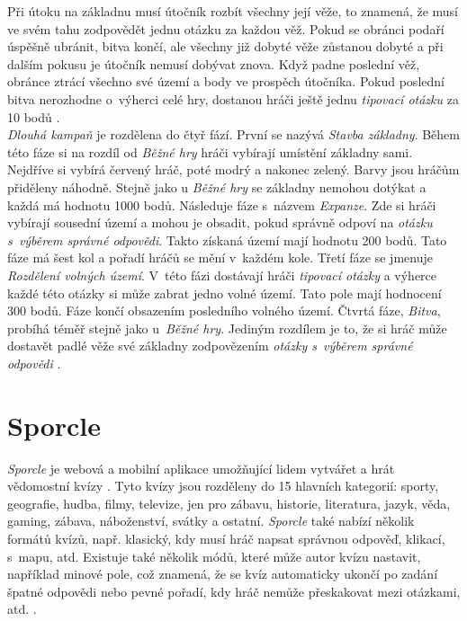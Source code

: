 \documentclass[12pt]{report}
\begin{document}
	  Při útoku na základnu musí útočník rozbít všechny její věže, to znamená, že musí ve svém tahu zodpovědět jednu otázku za každou věž. Pokud se obránci podaří úspěšně ubránit, bitva končí, ale všechny již dobyté věže zůstanou dobyté a při dalším pokusu je útočník nemusí dobývat znova. Když padne poslední věž, obránce ztrácí všechno své území a body ve prospěch útočníka. Pokud poslední bitva nerozhodne o~výherci celé hry, dostanou hráči ještě jednu \textit{tipovací otázku} za 10 bodů \cite{THXGames2023}.\\
	
\textit{Dlouhá kampaň} je rozdělena do čtyř fází. První se nazývá\textit{ Stavba základny}. Během této fáze si na rozdíl od\textit{ Běžné hry} hráči vybírají umístění základny sami. Nejdříve si vybírá červený hráč, poté modrý a nakonec zelený. Barvy jsou hráčům přiděleny náhodně. Stejně jako u\textit{ Běžné hry} se základny nemohou dotýkat a každá má hodnotu 1000 bodů. Následuje fáze s~názvem \textit{Expanze}. Zde si hráči vybírají sousední území a mohou je obsadit, pokud správně odpoví na \textit{otázku s~výběrem správné odpovědi}. Takto získaná území mají hodnotu 200 bodů. Tato fáze má šest kol a pořadí hráčů se mění v~každém kole. Třetí fáze se jmenuje \textit{Rozdělení volných území}. V~této fázi dostávají hráči \textit{tipovací otázky} a výherce každé této otázky si může zabrat jedno volné území. Tato pole mají hodnocení 300 bodů. Fáze končí obsazením posledního volného území. Čtvrtá fáze,\textit{ Bitva}, probíhá téměř stejně jako u~\textit{Běžné hry}. Jediným rozdílem je to, že si hráč může dostavět padlé věže své základny zodpovězením\textit{ otázky s~výběrem správné odpovědi} \cite{Dobyvatel2018}.


\section{Sporcle}
\textit{Sporcle} je webová a mobilní aplikace umožňující lidem vytvářet a hrát vědomostní kvízy \cite{Sporcle2025a}. Tyto kvízy jsou rozděleny do 15 hlavních kategorií: sporty, geografie, hudba, filmy, televize, jen pro zábavu, historie, literatura, jazyk, věda, gaming, zábava, náboženství, svátky a ostatní. \textit{Sporcle} také nabízí několik formátů kvízů, např. klasický, kdy musí hráč napsat správnou odpověď, klikací, s~mapu, atd.  Existuje také několik módů, které může autor kvízu nastavit, například minové pole, což znamená, že se kvíz automaticky ukončí po zadání špatné odpovědi nebo pevné pořadí, kdy hráč nemůže přeskakovat mezi otázkami, atd. \cite{Sporcle2025}.
\end{document}
